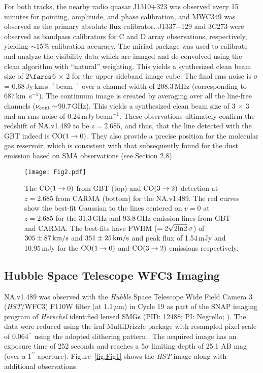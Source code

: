 \documentclass[iop,apj,useAMS,usenatbib]{emulateapj-rtx4}
\begin{document}
For both tracks, the nearby radio quasar J1310+323 was observed every 15 minutes for
pointing, amplitude, and phase calibration, and MWC349 was observed as the primary
absolute flux calibrator. J1337$-$129 and 3C273 were observed as bandpass calibrators for C and D array observations, respectively, yielding $\sim
$15\% calibration accuracy.
The {\sc miriad} package was used to calibrate and analyze the visibility data which are imaged and de-convolved using
the {\sc clean} algorithm with ``natural'' weighting. This yields a synthesized clean beam size of 2$\farcs$6 $\times$ 2 for the upper sideband image cube. The final rms noise is $\sigma$ = 0.68\,Jy\,km\,s$^{-1}$\,beam$^{-1}$ over a channel width of 208.3\,MHz (corresponding to 687\,km \,s$^{-1}$). %
The continuum image is created by averaging over all the line-free channels ($\nu_{\rm
  cont}\sim$90.7\,GHz). This yields a synthesized clean beam size of
3 $\times$ 3 and an rms noise of
0.24\,mJy\,beam$^{-1}$. These observations ultimately confirm the
redshift of NA.v1.489 to be $z = 2.685$, and thus, that the line
detected with the GBT indeed is $\rm {CO (1 \rightarrow 0)}$. They
also provide a precise position for the molecular gas reservoir, which
is consistent with that subsequently found for the dust emission based on SMA observations (see Section 2.8)

\begin{figure}
\centering
\texttt{[image: Fig2.pdf]}
\caption{The $\rm {CO (1 \rightarrow 0)}$ from GBT (top) and $\rm {CO
    (3 \rightarrow 2)}$ detection at $z = 2.685$ from CARMA (bottom)
  for the NA.v1.489. The red curves show the best-fit Gaussian to the
  lines centered on $v=0$ at $z=2.685$ for the 31.3\,GHz and 93.8\,GHz
  emission lines from GBT and CARMA. The best-fits have FWHM
  ($=2\sqrt{2{\rm ln}2}\,\sigma$) of  $305\pm87\,{\rm km/s}$ and
  $351\pm25\,{\rm km/s}$ and peak flux of 1.54\,mJy and 10.95\,mJy for the $\rm
  {CO (1 \rightarrow 0)}$ and $\rm {CO(3 \rightarrow
    2)}$ emissions respectively.}
\label{fig:Fig2}
\end{figure}

\subsection{Hubble Space Telescope WFC3 Imaging}

NA.v1.489 was observed with the {\it Hubble} Space Telescope Wide Field
Camera 3 ({\it HST}/WFC3) F110W filter (at 1.1\,$\mu$m) in Cycle 19 as part of
the SNAP imaging program of {\it Herschel} identified lensed SMGs
(PID: 12488; PI: Negrello; \citealp{Negrello2014}). The data were reduced using the {\sc iraf} MultiDrizzle
package with resampled pixel scale of 0.064$^{\prime\prime}$ using the adopted
dithering pattern \citep{Negrello2014}. The acquired image
has an exposure time of 252 seconds and reaches a 5$\sigma$ limiting
depth of 25.1 AB mag (over a $1^{\prime\prime}$
aperture). Figure~\ref{fig:Fig1} shows the {\it HST} image along with
additional observations. 
\end{document}
